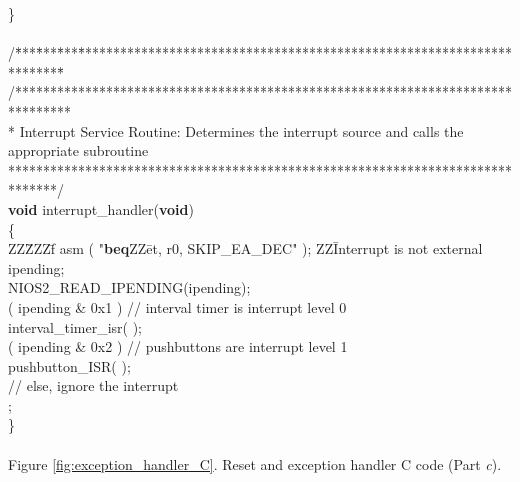 \begin{center}
\begin{minipage}[t]{12.5 cm}
\begin{tabbing}
\}\\
~\\
/\=***\=***\=***\=**********************************************************************\=\kill
/********************************************************************************\\
\>* Interrupt Service Routine: Determines the interrupt source and calls the appropriate subroutine\\
\>*******************************************************************************/\\
{\bf void} interrupt\_handler({\bf void})\\
\{\\
ZZ\=ZZZ\=f asm ( "{\bf beq}ZZ\=et, r0, SKIP\_EA\_DEC" ); ZZ\= Interrupt is not external\kill 
{} ipending;\\
\>NIOS2\_READ\_IPENDING(ipending);\\
 ( ipending \& 0x1 ) \>\>\>// interval timer is interrupt level 0\\
\>\>interval\_timer\_isr( );\\
 ( ipending \& 0x2 ) \>\>\>// pushbuttons are interrupt level 1\\
\>\>pushbutton\_ISR( );\\
\>// else, ignore the interrupt\\
;\\
\}\\
~\\
Figure \ref{fig:exception_handler_C}. Reset and exception handler C code (Part {\it c}).
\end{tabbing}
\end{minipage}
\end{center}
